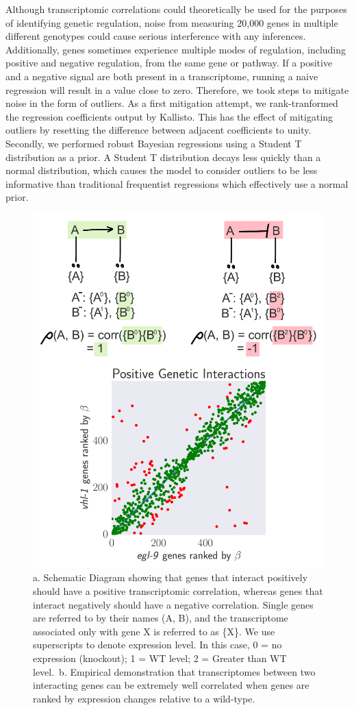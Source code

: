 \documentclass[9pt,twocolumn,twoside]{pnas-new}
\begin{document}
Although transcriptomic correlations could theoretically be used for the purposes of identifying genetic regulation, noise from measuring 20,000 genes in multiple different genotypes could cause serious interference with any inferences. Additionally, genes sometimes experience multiple modes of regulation, including positive and negative regulation, from the same gene or pathway. If a positive and a negative signal are both present in a transcriptome, running a naive regression will result in a value close to zero.
Therefore, we took steps to mitigate noise in the form of outliers. As a first mitigation attempt, we rank-tranformed the regression coefficients output by Kallisto. This has the effect of mitigating outliers by resetting the difference between adjacent coefficients to unity. Secondly, we performed robust Bayesian regressions using a Student T distribution as a prior. A Student T distribution decays less quickly than a normal distribution, which causes the model to consider outliers to be less informative than traditional frequentist regressions which effectively use a normal prior.

\begin{figure}%
\centering
\includegraphics[width=.8\linewidth]{figs/correlative_genetics.pdf}
\caption{a. Schematic Diagram showing that genes that interact positively should have a positive transcriptomic correlation, whereas genes that interact negatively should have a negative correlation. Single genes are referred to by their names (A, B), and the transcriptome associated only with gene X is referred to as \{X\}. We use superscripts to denote expression level. In this case, 0 = no expression (knockout); 1 = WT level; 2 = Greater than WT level.\ b. Empirical demonstration that transcriptomes between two interacting genes can be extremely well correlated when genes are ranked by expression changes relative to a wild-type.}
\label{fig:genetic_interactions}
\end{figure}
\end{document}
